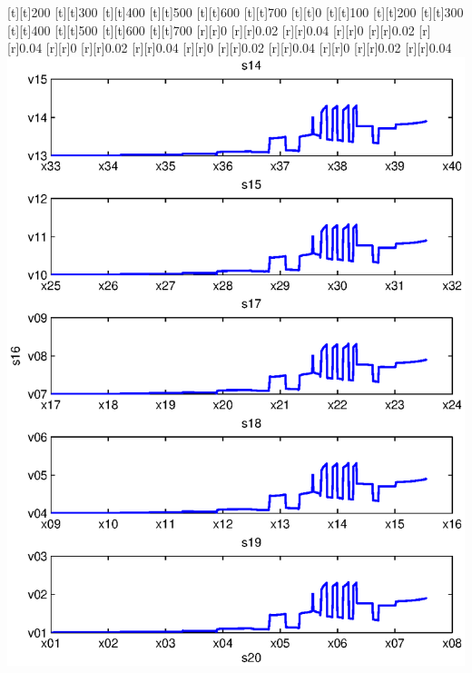 \begin{psfrags}
[t][t]{200}%
[t][t]{300}%
[t][t]{400}%
[t][t]{500}%
[t][t]{600}%
[t][t]{700}%
[t][t]{0}%
[t][t]{100}%
[t][t]{200}%
[t][t]{300}%
[t][t]{400}%
[t][t]{500}%
[t][t]{600}%
[t][t]{700}%
%
[r][r]{0}%
[r][r]{0.02}%
[r][r]{0.04}%
[r][r]{0}%
[r][r]{0.02}%
[r][r]{0.04}%
[r][r]{0}%
[r][r]{0.02}%
[r][r]{0.04}%
[r][r]{0}%
[r][r]{0.02}%
[r][r]{0.04}%
[r][r]{0}%
[r][r]{0.02}%
[r][r]{0.04}%
%
\includegraphics[width=15cm]{rmse_150_16.eps}%
\end{psfrags}%
%
